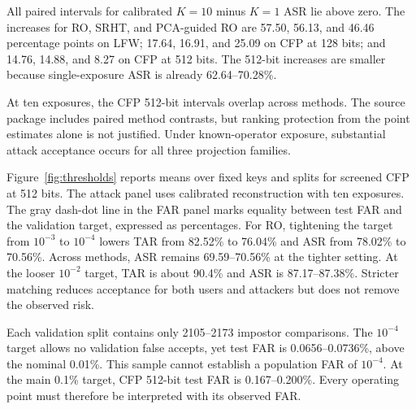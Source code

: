 All paired intervals for calibrated $K=10$ minus $K=1$ ASR lie above zero. The increases for RO, SRHT, and PCA-guided RO are 57.50, 56.13, and 46.46 percentage points on LFW; 17.64, 16.91, and 25.09 on CFP at 128 bits; and 14.76, 14.88, and 8.27 on CFP at 512 bits. The 512-bit increases are smaller because single-exposure ASR is already 62.64--70.28\%.

At ten exposures, the CFP 512-bit intervals overlap across methods. The source package includes paired method contrasts, but ranking protection from the point estimates alone is not justified. Under known-operator exposure, substantial attack acceptance occurs for all three projection families.


Figure~\ref{fig:thresholds} reports means over fixed keys and splits for screened CFP at 512 bits. The attack panel uses calibrated reconstruction with ten exposures. The gray dash-dot line in the FAR panel marks equality between test FAR and the validation target, expressed as percentages. For RO, tightening the target from $10^{-3}$ to $10^{-4}$ lowers TAR from 82.52\% to 76.04\% and ASR from 78.02\% to 70.56\%. Across methods, ASR remains 69.59--70.56\% at the tighter setting. At the looser $10^{-2}$ target, TAR is about 90.4\% and ASR is 87.17--87.38\%. Stricter matching reduces acceptance for both users and attackers but does not remove the observed risk.

Each validation split contains only 2105--2173 impostor comparisons. The $10^{-4}$ target allows no validation false accepts, yet test FAR is 0.0656--0.0736\%, above the nominal 0.01\%. This sample cannot establish a population FAR of $10^{-4}$. At the main 0.1\% target, CFP 512-bit test FAR is 0.167--0.200\%. Every operating point must therefore be interpreted with its observed FAR.


